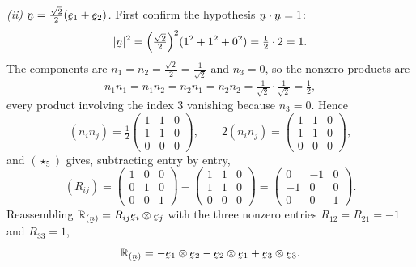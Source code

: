 \begin{solution}
\emph{(ii) $\bn=\tfrac{\sqrt2}{2}(\be_1+\be_2)$.} First confirm the
hypothesis $\ip\bn\bn=1$:
\[
   |\bn|^{2}=\Big(\tfrac{\sqrt2}{2}\Big)^{2}(1^{2}+1^{2}+0^{2})
   =\tfrac12\cdot2=1 .
\]
The components are $n_1=n_2=\tfrac{\sqrt2}{2}=\tfrac{1}{\sqrt2}$ and
$n_3=0$, so the nonzero products are
\[
   n_1n_1=n_1n_2=n_2n_1=n_2n_2=\tfrac{1}{\sqrt2}\cdot\tfrac{1}{\sqrt2}
   =\tfrac12 ,
\]
every product involving the index $3$ vanishing because $n_3=0$. Hence
\[
   (n_in_j)=\tfrac12\begin{pmatrix}1&1&0\\1&1&0\\0&0&0\end{pmatrix},
   \qquad 2(n_in_j)=\begin{pmatrix}1&1&0\\1&1&0\\0&0&0\end{pmatrix},
\]
and $(\star_5)$ gives, subtracting entry by entry,
\[
   (R_{ij})=\begin{pmatrix}1&0&0\\0&1&0\\0&0&1\end{pmatrix}
   -\begin{pmatrix}1&1&0\\1&1&0\\0&0&0\end{pmatrix}
   =\begin{pmatrix}0&-1&0\\-1&0&0\\0&0&1\end{pmatrix}.
\]
Reassembling $\Refl{\bn}=R_{ij}\be_i\otimes\be_j$ with the three nonzero
entries $R_{12}=R_{21}=-1$ and $R_{33}=1$,
\[
   \Refl{\bn}=-\be_1\otimes\be_2-\be_2\otimes\be_1+\be_3\otimes\be_3 .
\]



\end{solution}
